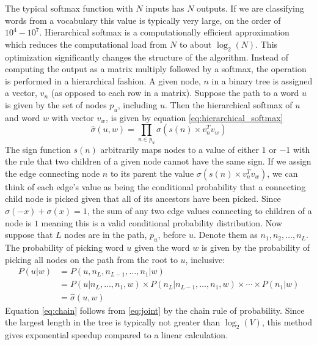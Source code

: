 The typical softmax function with $N$ inputs has $N$ outputs.  If we are classifying words from a vocabulary this value is typically very large, on the order of $10^4 - 10^7$.  Hierarchical softmax is a computationally efficient approximation which reduces the computational load from $N$ to about $\log_2(N)$.  This optimization significantly changes the structure of the algorithm.  Instead of computing the output as a matrix multiply followed by a softmax, the operation is performed in a hierarchical fashion.  A given node, $n$ in a binary tree is assigned a vector, $v_n$ (as opposed to each row in a matrix).  Suppose the path to a word $u$ is given by the set of nodes $p_u$, including $u$.  Then the hierarchical softmax of $u$ and word $w$ with vector $v_w$, is given by equation \ref{eq:hierarchical_softmax}
\begin{equation}\label{eq:hierarchical_softmax}
\hat{\sigma}(u,w) = \prod_{n\in p_u} \sigma (s(n)\times v_n^Tv_w)
\end{equation}
The sign function $s(n)$ arbitrarily maps nodes to a value of either $1$ or $-1$ with the rule that two children of a given node cannot have the same sign.  If we assign the edge connecting node $n$ to its parent the value $\sigma (s(n)\times v_n^Tv_w)$, we can think of each edge's value as being the conditional probability that a connecting child node is picked given that all of its ancestors have been picked.  Since $\sigma(-x) + \sigma(x) = 1$, the sum of any two edge values connecting to children of a node is $1$ meaning this is a valid conditional probability distribution.  Now suppose that $L$ nodes are in the path, $p_u$, before $u$.  Denote them as $n_1,n_2,\dots,n_L$.  The probability of picking word $u$ given the word $w$ is given by the probability of picking all nodes on the path from the root to $u$, inclusive:
\begin{align}
P(u|w) \label{eq:joint} &=P(u,n_L,n_{L-1},\dots,n_1|w)\\ \label{eq:chain}
&=P(u|n_L,\dots,n_1,w)\times P(n_L|n_{L-1},\dots,n_1,w)\times \cdots \times P(n_1|w)\\
&=\hat{\sigma}(u,w)
\end{align}
Equation \ref{eq:chain} follows from \ref{eq:joint} by the chain rule of probability.  Since the largest length in the tree is typically not greater than $\log_2(V)$, this method gives exponential speedup compared to a linear calculation.

